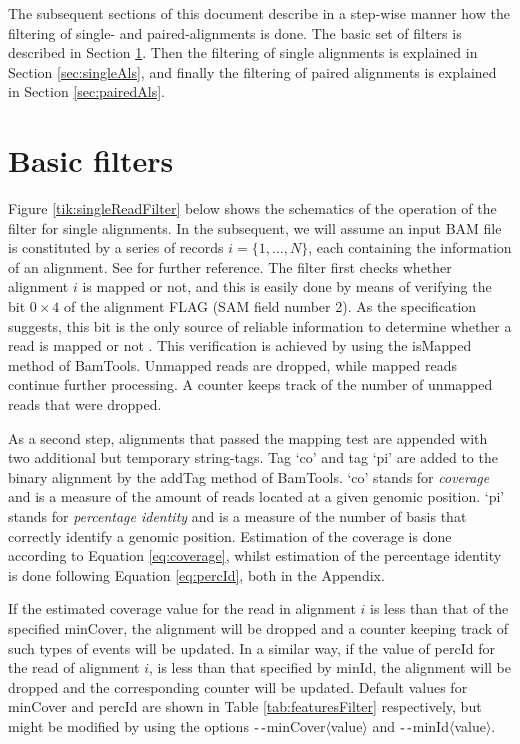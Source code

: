 \documentclass[11pt]{article}
\newcommand{\printOption}[1]{$\textrm{-\,-}${\fontfamily{phv}\selectfont#1}$\langle${\fontfamily{phv}\selectfont value}$\rangle$}
\newcommand{\option}[1]{{\fontfamily{phv}\selectfont#1}}
\newcommand{\bamApi}[1]{{\fontfamily{bch}\selectfont#1}}
\begin{document}
{The subsequent sections of this document describe in a step-wise manner how the filtering of single- and 
paired-alignments is done. The basic set of filters is described in Section \ref{sec:basicFilters}. 
Then the filtering of single alignments is explained in Section \ref{sec:singleAls}, and finally the filtering 
of paired alignments is explained in Section \ref{sec:pairedAls}.


\section{Basic filters} \label{sec:basicFilters}
Figure \ref{tik:singleReadFilter} below shows the schematics of the operation of the filter for single 
alignments. In the subsequent, we will assume an input BAM file is constituted by a series of records 
$i=\{1,\dots,N\}$, each containing the information of an alignment. See \citep{heng09:SAM} for further 
reference. The filter first checks whether 
alignment $i$ is mapped or not, and this is easily done by means of verifying the bit $0\times4$ of the 
alignment FLAG (SAM field number 2). As the specification suggests, this bit is the only source 
of reliable information to determine whether a read is mapped or not \citet{heng09:SAM}. This verification 
is achieved by using the \bamApi{isMapped} method of BamTools. Unmapped reads are dropped, while mapped 
reads continue further processing. A counter keeps track of the number of unmapped reads that were dropped. 

As a second step, alignments that passed the mapping test are appended with two additional but temporary 
string-tags. Tag `co' and tag `pi' are added to the binary alignment by the \bamApi{addTag} method of BamTools. 
`co' stands for \emph{coverage} and is a measure of the amount of reads located at a given genomic position. 
`pi' stands for \emph{percentage identity} and is a measure of the number of basis that correctly identify 
a genomic position. Estimation of the coverage is done according to Equation \ref{eq:coverage}, whilst 
estimation of the percentage identity is done following Equation \ref{eq:percId}, both in the Appendix. 

If the estimated coverage value for the read in alignment $i$ is less than that of the specified 
\option{minCover}, the alignment will be dropped and a counter keeping track of such types of events will 
be updated. In a similar way, if the value of \option{percId} for the read of alignment $i$, is less than that 
specified by \option{minId}, the alignment will be dropped and the corresponding counter will be updated. 
Default values for \option{minCover} and \option{percId} are shown in Table \ref{tab:featuresFilter} 
respectively, but might be modified by using the options \printOption{minCover} and \printOption{minId}.


}
\end{document}
